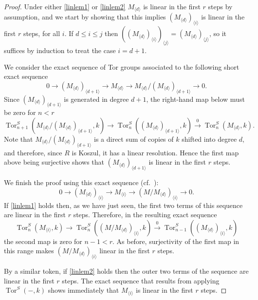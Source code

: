 \documentclass[a4paper,10pt]{amsart}
\theoremstyle{definition}
\theoremstyle{remark}
\DeclareMathOperator{\Tor}{Tor}
\begin{document}
\begin{proof}
Under either \ref{linlem1} or \ref{linlem2} $M_{\langle d\rangle}$ is linear in the first $r$ steps by assumption, and we start by showing that this implies $(M_{\langle d\rangle})_{\langle i\rangle}$ is linear in the first $r$ steps, for all $i$. If $d \leq i\leq j$ then $((M_{\langle d\rangle})_{\langle i\rangle})_{\langle j\rangle} = (M_{\langle d\rangle})_{\langle j\rangle}$, so it suffices by induction to treat the case $i=d+1$.

We consider the exact sequence of Tor groups associated to the following short exact sequence
\[
0\longrightarrow(M_{\langle d\rangle})_{\langle d+1\rangle} \longrightarrow M_{\langle d\rangle} \longrightarrow M_{\langle d\rangle}/(M_{\langle d\rangle})_{\langle d+1\rangle} \longrightarrow0.
\]
 Since $(M_{\langle d\rangle})_{\langle d+1\rangle}$ is generated in degree $d+1$, the right-hand map below must be zero for $n<r$
\[
\Tor^S_{n+1}(M_{\langle d\rangle}/(M_{\langle d\rangle})_{\langle d+1\rangle},k)\longrightarrow\Tor^S_{n}((M_{\langle d\rangle})_{\langle d+1\rangle} ,k)\xrightarrow{\ 0\ } \Tor^S_{n}(M_{\langle d\rangle} ,k).
\]
Note that $M_{\langle d\rangle}/(M_{\langle d\rangle})_{\langle d+1\rangle}$ is a direct sum of copies of $k$ shifted into degree $d$, and therefore, since $R$ is Koszul, it has a linear resolution. Hence the first map above being surjective shows that $(M_{\langle d\rangle})_{\langle d+1\rangle}$ is linear in the first $r$ steps.

We finish the proof using this exact sequence (cf.\ \cite[Lemma 5.5]{IR}):
\[
0\longrightarrow(M_{\langle d\rangle})_{\langle i\rangle}\longrightarrow M_{\langle i\rangle} \longrightarrow (M/M_{\langle d\rangle})_{\langle i\rangle}\longrightarrow0.
\]
If \ref{linlem1} holds then, as we have just seen, the first two terms of this sequence are linear in the first $r$ steps. Therefore, in the resulting exact sequence
\[
\Tor^S_{n}(M_{\langle i\rangle},k)\longrightarrow\Tor^S_{n}((M/M_{\langle d\rangle})_{\langle i\rangle} ,k)\xrightarrow{\ 0\ } \Tor^S_{n-1}((M_{\langle d\rangle})_{\langle i\rangle},k)
\]
the second map is zero for $n-1<r$. As before, surjectivity of the first map in this range makes $(M/M_{\langle d\rangle})_{\langle i\rangle}$ linear in the first $r$ steps.

By a similar token, if \ref{linlem2} holds then the outer two terms of the sequence are linear in the first $r$ steps. The exact sequence that results from applying $\Tor^S(-,k)$ shows immediately that $M_{\langle i\rangle}$ is linear in the first $r$ steps.
\end{proof}
\end{document}

